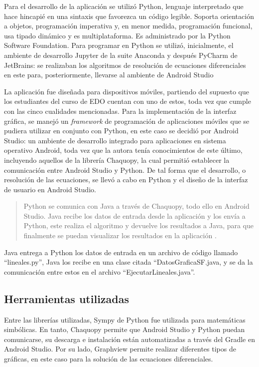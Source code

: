 \documentclass[spanish]{textolivre}
\begin{document}
Para el desarrollo de la aplicación se utilizó Python, lenguaje interpretado que hace hincapié en una sintaxis que favorezca un código legible. Soporta orientación a objetos, programación imperativa y, en menor medida, programación funcional, usa tipado dinámico y es multiplataforma. Es administrado por la Python Software Foundation. Para programar en Python se utilizó, inicialmente, el ambiente de desarrollo Jupyter de la suite Anaconda y después PyCharm de JetBrains: se realizaban los algoritmos de resolución de ecuaciones diferenciales en este para, posteriormente, llevarse al ambiente de Android Studio 

La aplicación fue diseñada para dispositivos móviles, partiendo del supuesto que los estudiantes del curso de EDO cuentan con uno de estos, toda vez que cumple con las cinco cualidades mencionadas. Para la implementación de la interfaz gráfica, se manejó un \emph{framework} de programación de aplicaciones móviles que se pudiera utilizar en conjunto con Python, en este caso se decidió por Android Studio: un ambiente de desarrollo integrado para aplicaciones en sistema operativo Android, toda vez que la autora tenía conocimientos de este último, incluyendo aquellos de la librería Chaquopy, la cual permitió establecer la comunicación entre Android Studio y Python. De tal forma que el desarrollo, o resolución de las ecuaciones, se llevó a cabo en Python y el diseño de la interfaz de usuario en Android Studio.

\begin{quote}
Python se comunica con Java a través de Chaquopy, todo ello en Android Studio. Java recibe los datos de entrada desde la aplicación y los envía a Python, este realiza el algoritmo y devuelve los resultados a Java, para que finalmente se puedan visualizar los resultados en la aplicación \cite[p. 20]{garcia2020}.
\end{quote}

Java entrega a Python los datos de entrada en un archivo de código llamado “lineales.py”, Java los recibe en una clase citada “DatosGraficaSF.java, y se da la comunicación entre estos en el archivo “EjecutarLineales.java”.

\subsection{Herramientas utilizadas}
Entre las librerías utilizadas, Sympy de Python fue utilizada para matemáticas simbólicas. En tanto, Chaquopy permite que Android Studio y Python puedan comunicarse, su descarga e instalación están automatizadas a través del Gradle en Android Studio. Por su lado, Graphview permite realizar diferentes tipos de gráficas, en este caso para la solución de las ecuaciones diferenciales.
\end{document}
